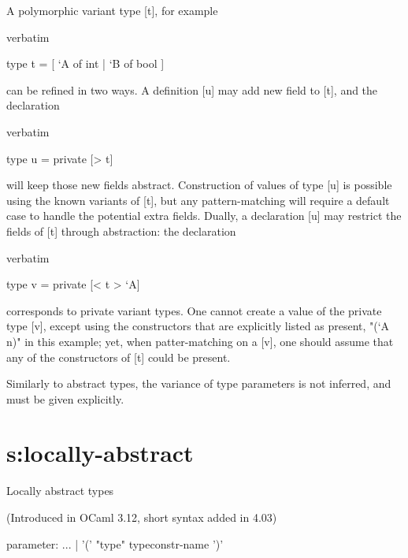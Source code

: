 A polymorphic variant type [t], for example
\begin{camlexample}{verbatim}
\begin{caml}
\begin{camlinput}
type t = [ `A of int | `B of bool ]
\end{camlinput}
\end{caml}
\end{camlexample}
can be refined in two ways. A definition [u] may add new field to [t],
and the declaration
\begin{camlexample}{verbatim}
\begin{caml}
\begin{camlinput}
type u = private [> t]
\end{camlinput}
\end{caml}
\end{camlexample}
will keep those new fields abstract. Construction of values of type
[u] is possible using the known variants of [t], but any
pattern-matching will require a default case to handle the potential
extra fields. Dually, a declaration [u] may restrict the fields of [t]
through abstraction: the declaration
\begin{camlexample}{verbatim}
\begin{caml}
\begin{camlinput}
type v = private [< t > `A]
\end{camlinput}
\end{caml}
\end{camlexample}
corresponds to private variant types. One cannot create a value of the
private type [v], except using the constructors that are explicitly
listed as present, "(`A n)" in this example; yet, when
patter-matching on a [v], one should assume that any of the
constructors of [t] could be present.

Similarly to abstract types, the variance of type parameters
is not inferred, and must be given explicitly.

\section{s:locally-abstract}{Locally abstract types}


(Introduced in OCaml 3.12, short syntax added in 4.03)

\begin{syntax}
parameter:
       ...
     | '(' "type" {{typeconstr-name}} ')'
\end{syntax}

